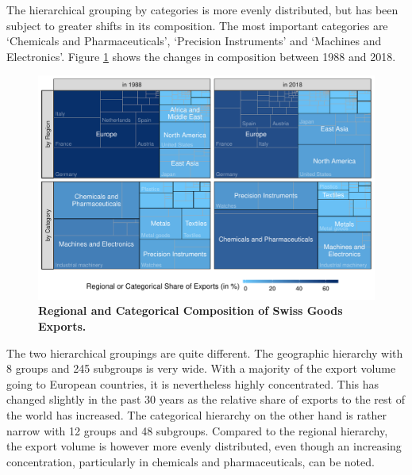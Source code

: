 \documentclass[a4paper,fleqn,11pt]{article}
\begin{document}
The hierarchical grouping by categories is more evenly distributed, but has been subject to greater shifts in its composition. The most important categories are `Chemicals and Pharmaceuticals', `Precision Instruments' and `Machines and Electronics'. Figure \ref{fig:treemap} shows the changes in composition between 1988 and 2018.
\begin{figure}[H]
	\includegraphics[width=\textwidth]{fig/fig_treemap}
	\caption[Regional and Categorical Composition of Swiss Goods Exports]{\textbf{Regional and Categorical Composition of Swiss Goods Exports.}}\label{fig:treemap}
\end{figure}
The two hierarchical groupings are quite different. The geographic hierarchy with 8 groups and 245 subgroups is very wide. With a majority of the export volume going to European countries, it is nevertheless highly concentrated. This has changed slightly in the past 30 years as the relative share of exports to the rest of the world has increased. The categorical hierarchy on the other hand is rather narrow with 12 groups and 48 subgroups. Compared to the regional hierarchy, the export volume is however more evenly distributed, even though an increasing concentration, particularly in chemicals and pharmaceuticals, can be noted.\\
\end{document}
